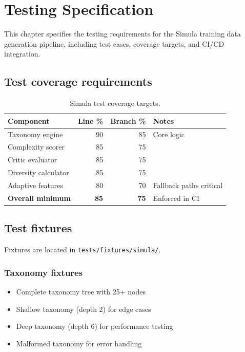 \chapter{Testing Specification}\label{ch:testing}

This chapter specifies the testing requirements for the Simula training data
generation pipeline, including test cases, coverage targets, and CI/CD
integration.

\section{Test coverage requirements}

\begin{table}[htbp]
\centering
\caption{Simula test coverage targets.}
\label{tab:simula-coverage}
\footnotesize
\begin{tabularx}{\linewidth}{@{}l r r X@{}}
\toprule
\textbf{Component} & \textbf{Line \%} & \textbf{Branch \%} & \textbf{Notes} \\ \midrule
Taxonomy engine & 90 & 85 & Core logic \\
Complexity scorer & 85 & 75 & \\
Critic evaluator & 85 & 75 & \\
Diversity calculator & 85 & 75 & \\
Adaptive features & 80 & 70 & Fallback paths critical \\
\textbf{Overall minimum} & \textbf{85} & \textbf{75} & Enforced in CI \\
\bottomrule
\end{tabularx}
\end{table}

\section{Test fixtures}

Fixtures are located in \texttt{tests/fixtures/simula/}.

\subsection{Taxonomy fixtures}

\begin{itemize}
  \item Complete taxonomy tree with 25+ nodes
  \item Shallow taxonomy (depth 2) for edge cases
  \item Deep taxonomy (depth 6) for performance testing
  \item Malformed taxonomy for error handling
\end{itemize}

